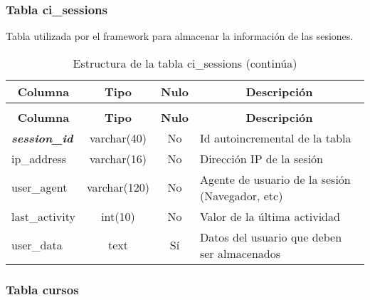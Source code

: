 \subsubsection{Tabla ci\_sessions}

Tabla utilizada por el framework para almacenar la información de las sesiones.

%
%
 \begin{longtable}{|l|c|c|l|} 
 \caption{Estructura de la tabla ci\_sessions} \label{tab:ci_sessions-structure} \\
 \hline \multicolumn{1}{|c|}{\textbf{Columna}} & \multicolumn{1}{|c|}{\textbf{Tipo}} & \multicolumn{1}{|c|}{\textbf{Nulo}} & \multicolumn{1}{|c|}{\textbf{Descripción}} \\ \hline \hline
\endfirsthead
 \caption{Estructura de la tabla ci\_sessions (continúa)} \\ 
 \hline \multicolumn{1}{|c|}{\textbf{Columna}} & \multicolumn{1}{|c|}{\textbf{Tipo}} & \multicolumn{1}{|c|}{\textbf{Nulo}} & \multicolumn{1}{|c|}{\textbf{Descripción}} \\ \hline \hline \endhead \endfoot 
\textbf{\textit{session\_id}} & varchar(40) & No & Id autoincremental de la tabla \\ \hline 
ip\_address & varchar(16) & No & Dirección IP de la sesión \\ \hline 
user\_agent & varchar(120) & No & Agente de usuario de la sesión (Navegador, etc) \\ \hline 
last\_activity & int(10)  & No & Valor de la última actividad \\ \hline 
user\_data & text & Sí & Datos del usuario que deben ser almacenados \\ \hline 
 \end{longtable}

\subsubsection{Tabla cursos}

